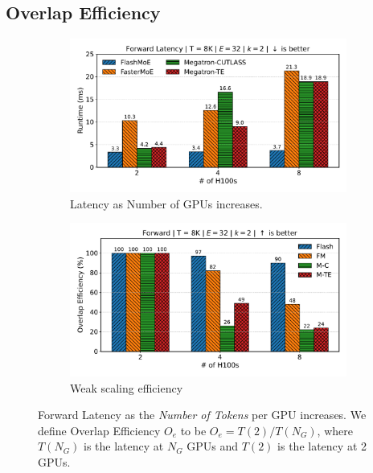 \subsection{Overlap Efficiency}\label{subsec:overlap-efficiency}
\begin{figure}[!h]
    \centering
    \begin{subfigure}{0.49\textwidth}
        \centering
        \includegraphics[width=\linewidth, keepaspectratio]{flash_figs/scaling_gpus_8}
        \caption{Latency as Number of GPUs increases.}
        \label{fig:lng}
    \end{subfigure}
    \begin{subfigure}{0.49\textwidth}
        \centering
        \includegraphics[width=\linewidth, keepaspectratio]{flash_figs/overlap_efficiency_8}
        \caption{Weak scaling efficiency}
        \label{fig:oe}
    \end{subfigure}
    \caption{Forward Latency as the \emph{Number of Tokens} per GPU increases. We define Overlap Efficiency $O_e$
        to be $O_e = T(2) / T(N_G)$, where $T(N_G)$ is the latency at $N_G$ GPUs and $T(2)$ is the latency at 2 GPUs.}
    \label{fig:oet}
\end{figure}
